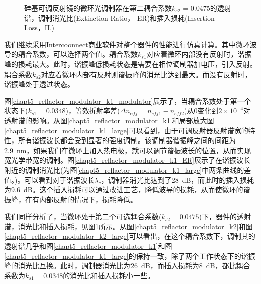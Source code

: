 \begin{figure}[htb]
{\begin{minipage}[]{0.5\textwidth}
		\end{minipage}}		
	\caption{硅基可调反射镜的微环光调制器在第二耦合系数$k_{s2}$ = 0.0475的透射谱，调制消光比(Extinction Ratio， ER)和插入损耗(Insertion Loss，IL)}
	\label{chapt5_reflactor_modulator_k2_modulator}	
\end{figure}	
我们继续采用Intercoonnect商业软件对整个器件的性能进行仿真计算。其中微环波导的耦合系数，可以选择两个值。耦合系数$k_{s1}$对应着微环内部没有反射时，谐振峰的损耗最大。此时，谐振峰低损耗状态是需要在相位调制器加电压，引入反射。耦合系数$k_{s2}$对应着微环内部有反射则谐振峰的消光比达到最大。而没有反射时，谐振峰处于透过状态。

图\ref{chapt5_reflactor_modulator_k1_modulator}展示了，当耦合系数处于第一个状态下($k_{s1} = 0.0348$)，等效折射率差($\Delta n_{eff} = n_{eff1}-n_{eff2}$)从0变化到$2 \times  10^{-4}$对透射谱的影响。从图\ref{chapt5_reflactor_modulator_k1}和局部放大图\ref{chapt5_reflactor_modulator_k1_large}可以看到，由于可调反射器反射谱宽的特性，所有谐振波长都会受到显著的强度调制。该调制器谐振峰之间的间距为2.9~nm，如果我们在微环上加入热电极，就可以调节谐振波长的位置，从而实现宽光学带宽的调制。图\ref{chapt5_reflactor_modulator_k1_ER}展示了在谐振波长附近的调制消光比(为图\ref{chapt5_reflactor_modulator_k1_large}中两条曲线的差值。)。可以看到对于谐振波长$\lambda_c$，调制器消光比达到了28~dB，而此时的插入损耗为9.6~dB。这个插入损耗可以通过改进工艺，降低波导的损耗，从而使微环的谐振峰，在有内部反射的情况下，损耗降低。

我们同样分析了，当微环处于第二个可选耦合系数($k_{s2} = 0.0475$)下，器件的透射谱，消光比和插入损耗，见图\ref{chapt5_reflactor_modulator_k2_modulator}所示。从图\ref{chapt5_reflactor_modulator_k2}和图\ref{chapt5_reflactor_modulator_k2_large}可以看出，在这个耦合系数下，调制其的透射谱几乎和图\ref{chapt5_reflactor_modulator_k1}和图\ref{chapt5_reflactor_modulator_k1_large}的保持一致，除了两个工作状态下的谐振峰的消光比互换。此时，调制器消光比为26~dB，而插入损耗为8~dB，都比耦合系数为$k_{s1}=0.0348$的消光比和插入损耗小一些。

